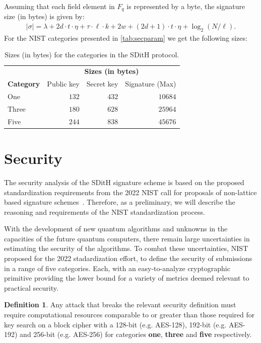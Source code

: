 \documentclass[11pt]{report}
\theoremstyle{definition}
\newtheorem{definition}{Definition}[section]
\theoremstyle{plain}
\begin{document}
Assuming that each field element in $F_q$ is represented by a byte, the signature size (in bytes) is given by:
\begin{align*}
  |\sigma| =
  \lambda + 2d \cdot t \cdot \eta + \tau \cdot \ell \cdot k + 2w + (2d + 1) \cdot t \cdot \eta + \log_2(N / \ell).
\end{align*}
For the NIST categories presented in \autoref{tab:secparam} we get the following sizes:

\begin{table}[H]
  \centering
  \begin{tabular}{|l|r|r|r|}
    \hline
    & \multicolumn{3}{c}{\textbf{Sizes (in bytes)}} \\
    \textbf{Category} & Public key & Secret key & Signature (Max) \\
    \hline
    One               & $132$         & $432$         & $10684$           \\
    Three             & $180$         & $628$         & $25964$           \\
    Five              & $244$         & $838$         & $45676$           \\
    \hline
  \end{tabular}
  \caption{Sizes (in bytes) for the categories in the SDitH protocol.}
  \label{tab:sizes}
\end{table}

\section{Security}

The security analysis of the SDitH signature scheme is based on the proposed standardization requirements from the 2022 NIST call for proposals of non-lattice based signature schemes~\cite{nistcall}. Therefore, as a preliminary, we will describe the reasoning and requirements of the NIST standardization process.

With the development of new quantum algorithms and unknowns in the capacities of the future quantum computers, there remain large uncertainties in estimating the security of the algorithms. To combat these uncertainties, NIST proposed for the 2022 stadardization effort, to define the security of submissions in a range of five categories. Each, with an easy-to-analyze cryptographic primitive providing the lower bound for a variety of metrics deemed relevant to practical security.

\begin{definition}\label{def:nistsec}
  Any attack that breaks the relevant security definition must require computational resources comparable to or greater than those required for key search on a block cipher with a 128-bit (e.g. AES-128), 192-bit (e.g. AES-192) and 256-bit (e.g. AES-256) for categories \textbf{one}, \textbf{three} and \textbf{five} respectively.
\end{definition}
\end{document}
